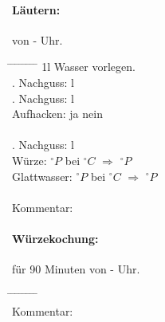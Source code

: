 \documentclass[12pt,oneside,a4paper]{scrartcl}
\begin{document}
\paragraph{Läutern:} von - Uhr.
	\begin{tabbing}
		\hspace{1cm} \= \hspace{1cm} \= \hspace{1cm} \= \hspace{1cm} \= \hspace{1cm} \=\hspace{1cm} \=\hspace{1cm} \=\hspace{1cm} \= \kill
		\> 1l Wasser vorlegen.\\
		\> . Nachguss: \> \> 4 l\\
		\> . Nachguss: \> \> 3 l\\
		\> \> \> Aufhacken: \> \> \Square ja \> \> \Square nein\\\\
		\> . Nachguss: \> \> 2 l\\
		\> Würze: \> \> \> $^\circ P$ \> bei \> $^\circ C$ \> $\Rightarrow$ \> $^\circ P$\\
		\> Glattwasser: \> \> \> $^\circ P$ \> bei \> $^\circ C$ \> $\Rightarrow$ \> $^\circ P$\\\\
		\> Kommentar: \> \> \>
	\end{tabbing}
%
\paragraph{Würzekochung:} für 90 Minuten von - Uhr.
	\begin{tabbing}
		\hspace{1cm} \= \hspace{1cm} \= \hspace{1cm} \= \hspace{1cm} \= \hspace{1cm} \= \hspace{1cm} \= \hspace{1cm} \= \hspace{1cm} \= \kill
		\\
		\> Kommentar: \> \> \>
	\end{tabbing}
%
\end{document}
